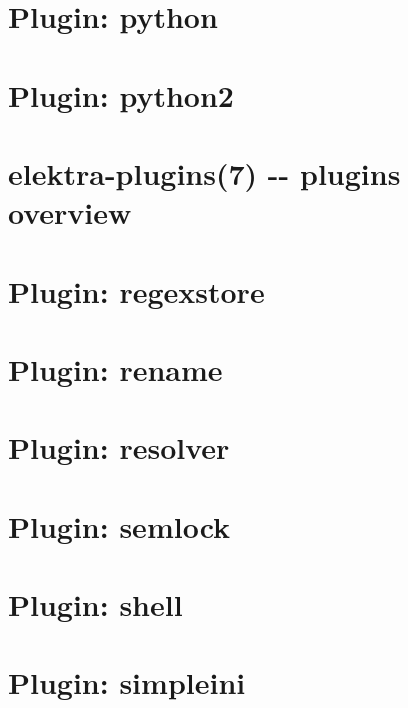 \documentclass[twoside]{book}
\newcommand{\+}{\discretionary{\mbox{\scriptsize$\hookleftarrow$}}{}{}}
\begin{document}
\chapter{Plugin\+: python}
\label{md_src_plugins_python_README}
\hypertarget{md_src_plugins_python_README}{}

\chapter{Plugin\+: python2}
\label{md_src_plugins_python2_README}
\hypertarget{md_src_plugins_python2_README}{}

\chapter{elektra-\/plugins(7) -\/-\/ plugins overview}
\label{md_src_plugins_README}
\hypertarget{md_src_plugins_README}{}

\chapter{Plugin\+: regexstore}
\label{md_src_plugins_regexstore_README}
\hypertarget{md_src_plugins_regexstore_README}{}

\chapter{Plugin\+: rename}
\label{md_src_plugins_rename_README}
\hypertarget{md_src_plugins_rename_README}{}

\chapter{Plugin\+: resolver}
\label{md_src_plugins_resolver_README}
\hypertarget{md_src_plugins_resolver_README}{}

\chapter{Plugin\+: semlock}
\label{md_src_plugins_semlock_README}
\hypertarget{md_src_plugins_semlock_README}{}

\chapter{Plugin\+: shell}
\label{md_src_plugins_shell_README}
\hypertarget{md_src_plugins_shell_README}{}

\chapter{Plugin\+: simpleini}
\label{md_src_plugins_simpleini_README}
\hypertarget{md_src_plugins_simpleini_README}{}

\end{document}
